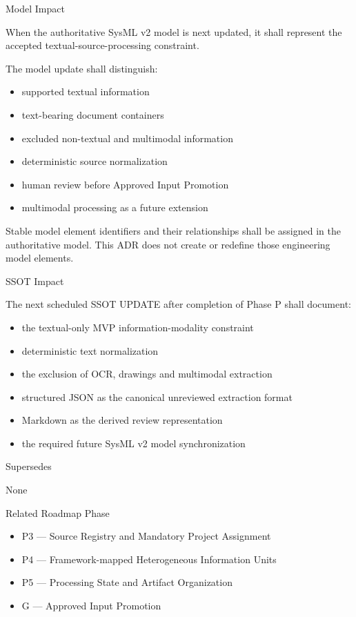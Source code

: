 Model Impact

When the authoritative SysML v2 model is next updated, it shall represent the accepted textual-source-processing constraint.

The model update shall distinguish:

\begin{itemize}
\tightlist
\item
  supported textual information
\item
  text-bearing document containers
\item
  excluded non-textual and multimodal information
\item
  deterministic source normalization
\item
  human review before Approved Input Promotion
\item
  multimodal processing as a future extension
\end{itemize}

Stable model element identifiers and their relationships shall be assigned in the authoritative model. This ADR does not create or redefine those engineering model elements.

SSOT Impact

The next scheduled SSOT UPDATE after completion of Phase P shall document:

\begin{itemize}
\tightlist
\item
  the textual-only MVP information-modality constraint
\item
  deterministic text normalization
\item
  the exclusion of OCR, drawings and multimodal extraction
\item
  structured JSON as the canonical unreviewed extraction format
\item
  Markdown as the derived review representation
\item
  the required future SysML v2 model synchronization
\end{itemize}

Supersedes

None

Related Roadmap Phase

\begin{itemize}
\tightlist
\item
  P3 --- Source Registry and Mandatory Project Assignment
\item
  P4 --- Framework-mapped Heterogeneous Information Units
\item
  P5 --- Processing State and Artifact Organization
\item
  G --- Approved Input Promotion
\end{itemize}

